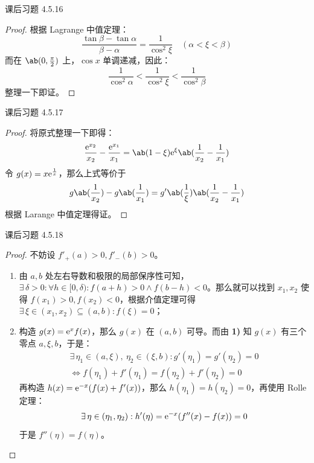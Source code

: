 \begin{problem}
	课后习题 4.5.16

	\begin{proof}
		根据 Lagrange 中值定理：
		$$
		\frac{\tan \beta - \tan \alpha}{\beta - \alpha} = \frac{1}{\cos^2 \xi} \quad (\alpha < \xi < \beta)
		$$
		而在 $\ab(0, \frac{\pi}{2})$ 上，$\cos x$ 单调递减，因此：
		$$
		\frac{1}{\cos^2 \alpha} < \frac{1}{\cos^2 \xi} < \frac{1}{\cos^2 \beta}
		$$
		整理一下即证。
	\end{proof}
\end{problem}

\begin{problem}
	课后习题 4.5.17

	\begin{proof}
		将原式整理一下即得：
		$$
		\frac{\E^{x_2}}{x_2} - \frac{\E^{x_1}}{x_1} = \ab(1 - \xi) \E^{\xi} \ab(\frac{1}{x_2} - \frac{1}{x_1})
		$$
		令 $g(x) = x \mathrm{e}^{\frac{1}{x}}$，那么上式等价于
		$$
		g\ab(\frac{1}{x_2}) - g\ab(\frac{1}{x_1}) = g'\ab(\frac{1}{\xi}) \ab(\frac{1}{x_2} - \frac{1}{x_1})
		$$
		根据 Larange 中值定理得证。
	\end{proof}
\end{problem}

\begin{problem}
	课后习题 4.5.18

	\begin{proof}
		不妨设 $f'_+(a) > 0, f'_-(b) > 0$。

		\begin{enumerate}
			\item 由 $a, b$ 处左右导数和极限的局部保序性可知，$\exists\,\delta > 0: \forall h \in [0, \delta): f(a + h) > 0 \land f(b - h) < 0$。那么就可以找到 $x_1, x_2$ 使得 $f(x_1) > 0, f(x_2) < 0$，根据介值定理可得 $\exists\,\xi \in (x_1, x_2) \subseteq (a, b): f(\xi) = 0$；
			
			\item 构造 $g(x) = \mathrm{e}^x f(x)$，那么 $g(x)$ 在 $(a, b)$ 可导。而由 \textbf{1)} 知 $g(x)$ 有三个零点 $a, \xi, b$，于是：
			$$
			\begin{gathered}
				\exists\,\eta_1 \in (a, \xi),\ \eta_2 \in (\xi, b): g'(\eta_1) = g'(\eta_2) = 0 \\
				\Leftrightarrow f(\eta_1) + f'(\eta_1) = f(\eta_2) + f'(\eta_2) = 0
			\end{gathered}
			$$
			再构造 $h(x) = \mathrm{e}^{-x} (f(x) + f'(x))$，那么 $h(\eta_1) = h(\eta_2) = 0$，再使用 Rolle 定理：
			$$
			\exists\,\eta \in (\eta_1, \eta_2): h'(\eta) = \mathrm{e}^{-x}(f''(x) - f(x)) = 0
			$$
			于是 $f''(\eta) = f(\eta)$。
		\end{enumerate}
	\end{proof}
\end{problem}